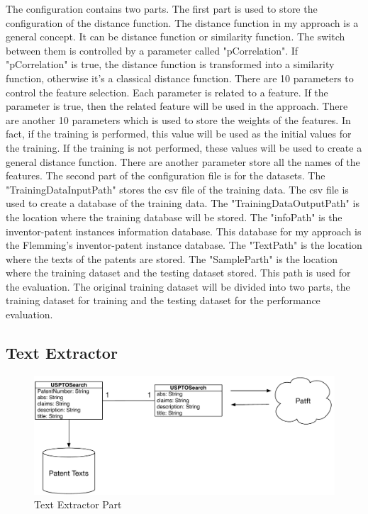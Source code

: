 The configuration contains two parts. The first part is used to store the configuration of the distance function. The distance function in my approach is a general concept. It can be distance function or similarity function. The switch between them is controlled by a parameter called "pCorrelation". If "pCorrelation" is true, the distance function is transformed into a similarity function, otherwise it's a classical distance function. There are 10 parameters to control the feature selection. Each parameter is related to a feature. If the parameter is true, then the related feature will be used in the approach. There are another 10 parameters which is used to store the weights of the features. In fact, if the training is performed, this value will be used as the initial values for the training. If the training is not performed, these values will be used to create a general distance function.  There are another parameter store all the names of the features. The second part of the configuration file is for the datasets. The "TrainingDataInputPath" stores the csv file of the training data. The csv file is used to create a database of the training data. The "TrainingDataOutputPath" is the location where the training database will be stored. The "infoPath" is the inventor-patent instances information database. This database for my approach is the Flemming's inventor-patent instance database. The "TextPath" is the location where the texts of the patents are stored. The "SampleParth" is the location where the training dataset and the testing dataset stored. This path is used for the evaluation. The original training dataset will be divided into two parts, the training dataset for training and the testing dataset for the performance evaluation. 

 

\subsection{Text Extractor}
\begin{figure}
\centering
\includegraphics[scale=0.65]{TextExtractor.pdf}
\caption{Text Extractor Part}
\end{figure}

